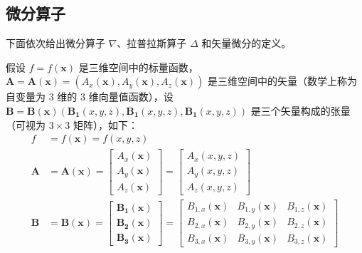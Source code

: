 \documentclass[UTF8]{report}
\theoremstyle{MyLineTheoremStyle} %
\theoremstyle{MyBlockTheoremStyle} %
\theoremstyle{MySubsubsectionStyle} %
\begin{document}
\subsection{微分算子}

下面依次给出微分算子 $\nabla$、拉普拉斯算子 $\Delta$ 和矢量微分的定义。

假设 $f = f(\boldsymbol{x})$ 是三维空间中的标量函数，$\boldsymbol{A} = \boldsymbol{A}(\boldsymbol{x}) = \left( A_x(\boldsymbol{x}), A_y(\boldsymbol{x}), A_z(\boldsymbol{x}) \right)$ 是三维空间中的矢量（数学上称为自变量为 3 维的 3 维向量值函数），设 $\boldsymbol{B} = \boldsymbol{B}(\boldsymbol{x}) \left( \boldsymbol{B_1}(x,y,z), \boldsymbol{B_1}(x,y,z), \boldsymbol{B_1}(x,y,z) \right)$ 是三个矢量构成的张量（可视为 $3 \times 3$ 矩阵），如下：
\begin{align}
    f &= f(\boldsymbol{x}) = f(x,y,z) 
    \\ 
    \boldsymbol{A} &= \boldsymbol{A}(\boldsymbol{x})  = 
    \begin{bmatrix}
        A_x(\boldsymbol{x}) \\ A_y(\boldsymbol{x}) \\ A_z(\boldsymbol{x})
    \end{bmatrix}=
    \begin{bmatrix}
        A_x(x,y,z) \\ A_y(x,y,z) \\ A_z(x,y,z)
    \end{bmatrix}
    \\ 
    \boldsymbol{B} &= \boldsymbol{B}(\boldsymbol{x}) = 
    \begin{bmatrix}
        \boldsymbol{B_1}(\boldsymbol{x}) \\ \boldsymbol{B_2}(\boldsymbol{x}) \\ \boldsymbol{B_3}(\boldsymbol{x})
    \end{bmatrix} = 
    \begin{bmatrix}
        B_{1,x}(\boldsymbol{x}) & B_{1,y}(\boldsymbol{x}) & B_{1,z}(\boldsymbol{x})\\ 
        B_{2,x}(\boldsymbol{x}) & B_{2,y}(\boldsymbol{x}) & B_{2,z}(\boldsymbol{x})\\
        B_{3,x}(\boldsymbol{x}) & B_{3,y}(\boldsymbol{x}) & B_{3,z}(\boldsymbol{x})
    \end{bmatrix}
\end{align}
\end{document}
